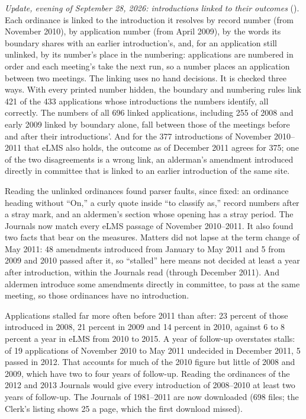 \textit{Update, evening of September 28, 2026: introductions linked to their outcomes}
(). Each ordinance is linked to the introduction it resolves by record number
(from November 2010), by application number (from April 2009), by the words its boundary shares with an earlier
introduction's, and, for an application still unlinked, by its number's place in the numbering: applications are
numbered in order and each meeting's take the next run, so a number places an application between two meetings. The
linking uses no hand decisions. It is checked three ways. With every printed number hidden, the boundary and
numbering rules link 421 of the 433 applications whose introductions the numbers identify, all correctly. The numbers
of all 696 linked applications, including 255 of 2008 and early 2009 linked by boundary alone, fall between those of
the meetings before and after their introductions'. And for the 377 introductions of November 2010--2011 that eLMS
also holds, the outcome as of December 2011 agrees for 375; one of the two disagreements is a wrong link, an
alderman's amendment introduced directly in committee that is linked to an earlier introduction of the same site.

Reading the unlinked ordinances found parser faults, since fixed: an ordinance heading without ``On,'' a curly quote
inside ``to classify as,'' record numbers after a stray mark, and an aldermen's section whose opening has a stray
period. The Journals now match every eLMS passage of November 2010--2011. It also found two facts that bear on the
measures. Matters did not lapse at the term change of May 2011: 48 amendments introduced from January to May 2011 and
5 from 2009 and 2010 passed after it, so ``stalled'' here means not decided at least a year after introduction,
within the Journals read (through December 2011). And aldermen introduce some amendments directly in committee, to
pass at the same meeting, so those ordinances have no introduction.

Applications stalled far more often before 2011 than after: 23 percent of those introduced in 2008, 21 percent in
2009 and 14 percent in 2010, against 6 to 8 percent a year in eLMS from 2010 to 2015. A year of follow-up overstates
stalls: of 19 applications of November 2010 to May 2011 undecided in December 2011, 5 passed in 2012. That accounts
for much of the 2010 figure but little of 2008 and 2009, which have two to four years of follow-up. Reading the
ordinances of the 2012 and 2013 Journals would give every introduction of 2008--2010 at least two years of follow-up.
The Journals of 1981--2011 are now downloaded (698 files; the Clerk's listing shows 25 a page, which the first
download missed).

